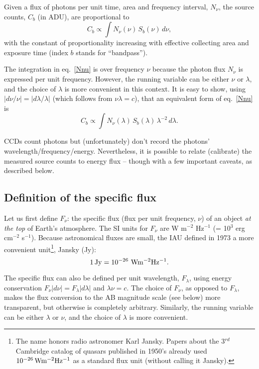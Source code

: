 \documentclass{emulateapj}
\begin{document}
Given a flux of photons per unit time, area and frequency interval, $N_\nu$, the 
source counts, $C_b$ (in ADU), are proportional to 
\begin{equation}
\label{Nnu}
        C_b \propto \int N_\nu(\nu) \, S_b(\nu) \, d\nu,
\end{equation}
with the constant of proportionality increasing with effective collecting area and exposure 
time (index $b$ stands for ``bandpass''). 

The integration in eq.~\ref{Nnu} is over frequency $\nu$ because the photon flux $N_\nu$ 
is expressed per unit frequency. However, the running variable can be either  $\nu$ or 
$\lambda$, and the choice of $\lambda$ is more convenient in this context. It is 
easy to show, using $|d\nu/\nu| = |d\lambda / \lambda|$ (which follows from $\nu \lambda=c$),
that an equivalent form of  eq.~\ref{Nnu} is
\begin{equation}
\label{Nnu2}
         C_b\propto \int N_\nu(\lambda) \, S_b(\lambda) \, \lambda^{-2} \, d\lambda. 
\end{equation}


CCDs count photons but (unfortunately) don't record the photons' wavelength/frequency/energy.
Nevertheless, it is possible to relate (calibrate) the measured source counts to energy flux -- though
with a few important caveats, as described below. 

 

\subsection{Definition of the specific flux} 

Let us first  define $F_\nu$: the specific flux (flux per unit frequency, $\nu$) of an 
object {\it at the top} of Earth's atmosphere. The SI units for $F_\nu$ are 
W m$^{-2}$ Hz$^{-1}$ (= 10$^{3}$ erg cm$^{-2}$ s$^{-1}$). Because astronomical 
fluxes are small, the IAU defined in 1973 a more convenient unit\footnote{The
name honors radio astronomer Karl Jansky. Papers about the 3$^{rd}$ Cambridge 
catalog of quasars published in 1950's already used $10^{-26} \, {\rm W m^{-2} Hz^{-1}}$
as a standard flux unit (without calling it Jansky).},  Jansky (Jy): 
\begin{equation}
            1 \, {\rm Jy} = 10^{-26} \,\, {\rm W m^{-2} Hz^{-1}}.
\end{equation} 

The specific flux can also be defined per unit wavelength, $F_\lambda$, using energy 
conservation $F_\nu |d\nu|=F_\lambda |d\lambda|$ and $\lambda \nu = c$.
The choice of $F_\nu$, as opposed to $F_\lambda$, makes the flux conversion 
to the AB magnitude scale (see below) more transparent, but otherwise is completely
arbitrary. Similarly, the running variable can be either  $\lambda$ or $\nu$, and the 
choice of $\lambda$ is more convenient.
\end{document}
